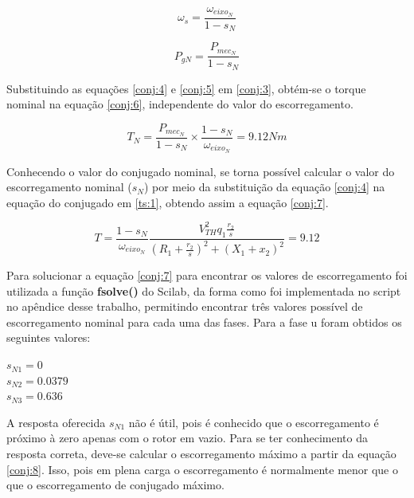 \begin{equation} \label{conj:4}
\omega_s= \frac{\omega_{eixo_N}}{1-s_N}
\end{equation}

\begin{equation} \label{conj:5}
P_{gN} = \frac{P_{mec_N}}{1-s_N}
\end{equation}

Substituindo as equações \ref{conj:4} e \ref{conj:5} em \ref{conj:3}, obtém-se o torque nominal na equação \ref{conj:6}, independente do valor do escorregamento.

\begin{equation} \label{conj:6}
T_N = \frac{P_{mec_N}}{1-s_N}\times\frac{1-s_N}{\omega_{eixo_N}} = 9.12 Nm
\end{equation}

Conhecendo o valor do conjugado nominal, se torna possível calcular o valor do escorregamento nominal ($s_N$) por meio da substituição da equação \ref{conj:4} na equação do conjugado em \ref{ts:1}, obtendo assim a equação \ref{conj:7}.

\begin{equation} \label{conj:7}
T=\frac{1-s_N}{\omega_{eixo_N}}\frac{V_{TH}^2q_1\frac{r_2}{s}}{\left(R_1+\frac{r_2}{s}\right)^2+(X_1+x_2)^2} = 9.12
\end{equation}

Para solucionar a equação \ref{conj:7} para encontrar os valores de escorregamento foi utilizada a função \textbf{fsolve()} do Scilab, da forma como foi implementada no script no apêndice desse trabalho, permitindo encontrar três valores possível de escorregamento nominal para cada uma das fases. Para a fase u foram obtidos os seguintes valores:

\begin{center}
    $s_{N1} = 0$ \vspace{5pt}\\
    $s_{N2} = 0.0379$ \vspace{5pt}\\
    $s_{N3} = 0.636$
\end{center}

A resposta oferecida $s_{N1}$ não é útil, pois é conhecido que o escorregamento é próximo à zero apenas com o rotor em vazio. Para se ter conhecimento da resposta correta, deve-se calcular o escorregamento máximo a partir da equação \ref{conj:8}. Isso, pois em plena carga o escorregamento é normalmente menor que o que o escorregamento de conjugado máximo.

